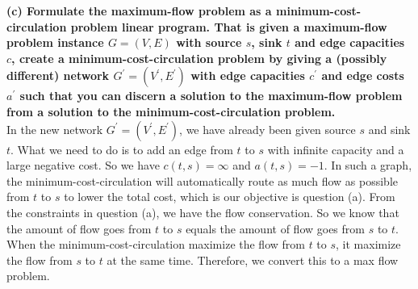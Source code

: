 \documentclass{article}
\begin{document}
\newline
\textbf{(c) Formulate the maximum-flow problem as a minimum-cost-circulation problem linear program. That is given a maximum-flow problem instance $G = (V, E)$ with source $s$, sink $t$ and edge capacities $c$, create a minimum-cost-circulation problem by giving a (possibly different) network $G^{'} = (V^{'}, E^{'})$ with edge capacities $c^{'}$ and edge costs $a^{'}$ such that you can discern a solution to the maximum-flow problem from a solution to the minimum-cost-circulation problem.}\\ \newline
In the new network $G^{'} = (V^{'}, E^{'})$, we have already been given source $s$ and sink $t$. What we need to do is to add an edge from $t$ to $s$ with infinite capacity and a large negative cost. So we have $c(t, s) = \infty$ and $a(t, s) = -1$. In such a graph, the minimum-cost-circulation will automatically route as much flow as possible from $t$ to $s$ to lower the total cost, which is our objective is question (a). From the constraints in question (a), we have the flow conservation. So we know that the amount of flow goes from $t$ to $s$ equals the amount of flow goes from $s$ to $t$. When the minimum-cost-circulation maximize the flow from $t$ to $s$, it maximize the flow from $s$ to $t$ at the same time. Therefore, we convert this to a max flow problem. 
\end{document}
